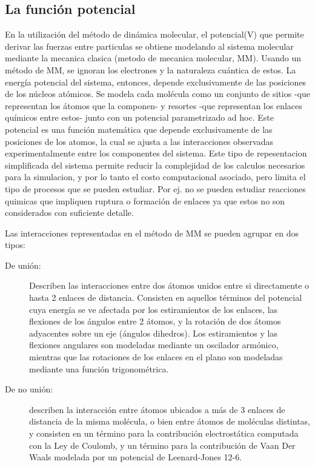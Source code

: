 \documentclass[a4paper,10pt]{report}
\begin{document}
\subsection{La función potencial}


En la utilización del método de dinámica molecular, el potencial(V) que permite derivar las fuerzas entre particulas se obtiene modelando al sistema molecular mediante la mecanica clasica (metodo de mecanica molecular, MM).
Usando un método de MM, se ignoran los electrones y la naturaleza cuántica de estos. La energía potencial del sistema, entonces, depende exclusivamente de las posiciones de los núcleos atómicos. Se modela cada molécula como un conjunto de sitios -que representan los átomos que la componen- y resortes -que representan los enlaces químicos entre estos- junto con un potencial parametrizado ad hoc.
Este potencial es una función matemática que depende exclusivamente de las posiciones de los atomos, la cual se ajusta a las interacciones observadas experimentalmente entre los componentes del sistema. Este tipo de repesentacion simplificada del sistema permite reducir la complejidad de los calculos necesarios para la simulacion, y por lo tanto el costo computacional asociado, pero limita el tipo de procesos que se pueden estudiar. Por ej. no se pueden estudiar reacciones quimicas que impliquen ruptura o formación de enlaces ya que estos no son considerados con suficiente detalle.

Las interacciones representadas en el método de MM se pueden agrupar en dos tipos:

\begin{description}
 \item [De unión:] Describen las interacciones entre dos átomos unidos entre si directamente o hasta 2 enlaces de distancia. 
 Consisten en aquellos términos del potencial cuya energía se ve afectada por los estiramientos de los enlaces, las flexiones de los ángulos entre 2 átomos, y la rotación de dos átomos adyacentes sobre un eje (ángulos dihedros). Los estiramientos y las flexiones angulares son modeladas
mediante un oscilador armónico, mientras que las rotaciones de los enlaces en el plano son modeladas mediante una función trigonométrica.

\item [De no unión:] describen la interacción entre átomos ubicados a más de 3 enlaces de distancia de la misma molécula, o bien entre átomos de moléculas distintas, y consisten en un término para la
contribución electrostática computada con la Ley de Coulomb, y un término para la contribución de Vaan Der Waals modelada por un potencial de Leenard-Jones 12-6.


\end{description}
\end{document}
